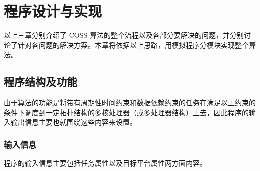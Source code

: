 ﻿%
\chapter{程序设计与实现}
\label{chapter-program}

以上三章分别介绍了 COSS 算法的整个流程以及各部分要解决的问题，并分别讨论了针对各问题的解决方案。本章将依据以上思路，用模拟程序分模块实现整个算法。

\section{程序结构及功能}
\label{sec-prgraom-structure}
由于算法的功能是将带有周期性时间约束和数据依赖约束的任务在满足以上约束的条件下调度到一定拓扑结构的多核处理器（或多处理器结构）上去，因此程序的输入输出信息主要也就围绕这些内容来设置。

\subsection{输入信息}

程序的输入信息主要包括任务属性以及目标平台属性两方面内容。

